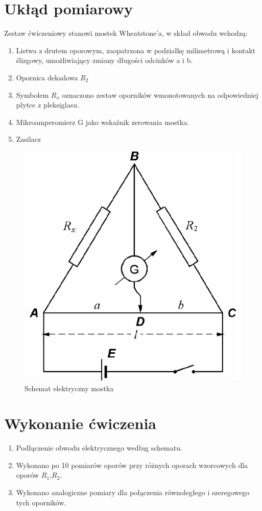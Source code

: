 \documentclass{article}
\begin{document}
\section{Ukłąd pomiarowy}
Zestaw ćwiczeniowy stanowi mostek Wheatstone'a, w skład obwodu wchodzą:
\begin{enumerate}
\item Listwa z drutem oporowym, zaopatrzona w podziałkę milimetrową i kontakt ślizgowy, umożliwiający zmiany długości odcinków a i b.
\item Opornica dekadowa $R_{2}$
\item Symbolem $R_{x}$ oznaczono zestaw oporników wmonotowanych na odpowiedniej płytce z pleksiglasu.
\item Mikroamperomierz G jako wskaźnik zerowania mostka.
\item Zasilacz
\end{enumerate}
\begin{figure}[!htb]
	\centering
	\includegraphics[scale=0.5]{mostek.png}
	\caption{Schemat elektryczny mostka}
\end{figure}	
\section{Wykonanie ćwiczenia}
\begin{enumerate}
	\item Podłączenie obwodu elektrycznego według schematu.
	\item Wykonano po 10 pomiarów oporów przy różnych oporach wzorcowych dla oporów $R_{1}$,$R_{2}$.
	\item Wykonano analogiczne pomiary dla połączenia równoległego i szeregowego tych oporników.
\end{enumerate}
	
\end{document}
